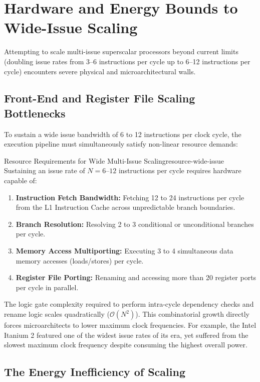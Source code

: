 \section{Hardware and Energy Bounds to Wide-Issue Scaling}
\label{sec:hardware_energy_bounds_ilp}

Attempting to scale multi-issue superscalar processors beyond current limits (doubling issue rates from 3–6 instructions per cycle up to 6–12 instructions per cycle) encounters severe physical and microarchitectural walls.

\subsection{Front-End and Register File Scaling Bottlenecks}

To sustain a wide issue bandwidth of 6 to 12 instructions per clock cycle, the execution pipeline must simultaneously satisfy non-linear resource demands:

\begin{concept}{Resource Requirements for Wide Multi-Issue Scaling}{resource-wide-issue}
Sustaining an issue rate of $N = 6\text{--}12$ instructions per cycle requires hardware capable of:
\begin{enumerate}
    \item \textbf{Instruction Fetch Bandwidth:} Fetching 12 to 24 instructions per cycle from the L1 Instruction Cache across unpredictable branch boundaries.
    \item \textbf{Branch Resolution:} Resolving 2 to 3 conditional or unconditional branches per cycle.
    \item \textbf{Memory Access Multiporting:} Executing 3 to 4 simultaneous data memory accesses (loads/stores) per cycle.
    \item \textbf{Register File Porting:} Renaming and accessing more than 20 register ports per cycle in parallel.
\end{enumerate}
\end{concept}

The logic gate complexity required to perform intra-cycle dependency checks and rename logic scales quadratically ($\mathcal{O}(N^2)$). This combinatorial growth directly forces microarchitects to lower maximum clock frequencies. For example, the Intel Itanium 2 featured one of the widest issue rates of its era, yet suffered from the slowest maximum clock frequency despite consuming the highest overall power.

\subsection{The Energy Inefficiency of  Scaling}

